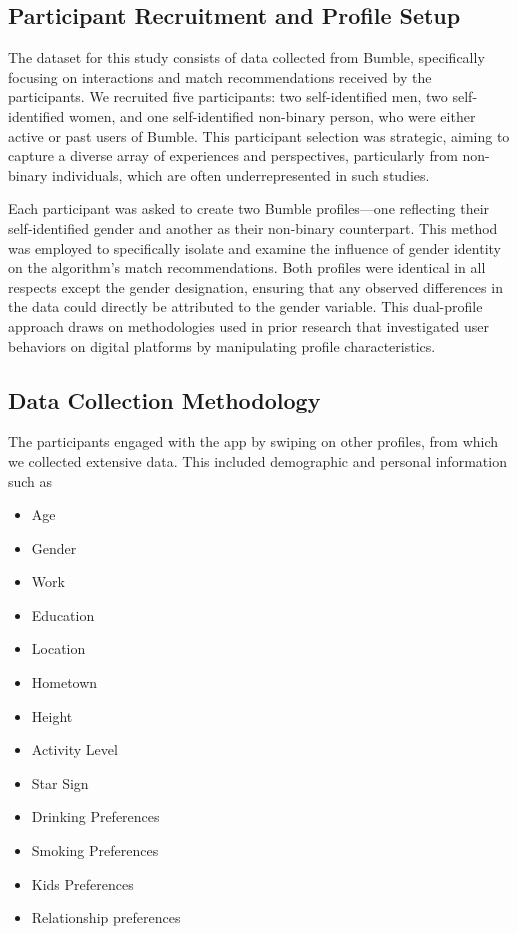 \subsection{Participant Recruitment and Profile Setup}
The dataset for this study consists of data collected from Bumble, specifically focusing on interactions and match recommendations received by the participants. We recruited five participants: two self-identified men, two self-identified women, and one self-identified non-binary person, who were either active or past users of Bumble. This participant selection was strategic, aiming to capture a diverse array of experiences and perspectives, particularly from non-binary individuals, which are often underrepresented in such studies.

Each participant was asked to create two Bumble profiles—one reflecting their self-identified gender and another as their non-binary counterpart. This method was employed to specifically isolate and examine the influence of gender identity on the algorithm’s match recommendations. Both profiles were identical in all respects except the gender designation, ensuring that any observed differences in the data could directly be attributed to the gender variable. This dual-profile approach draws on methodologies used in prior research that investigated user behaviors on digital platforms by manipulating profile characteristics.

\subsection{Data Collection Methodology}
The participants engaged with the app by swiping on other profiles, from which we collected extensive data. This included demographic and personal information such as 
\begin{itemize}
    \item Age
    \item Gender
    \item Work
    \item Education
    \item Location
    \item Hometown
    \item Height 
    \item Activity Level
    \item Star Sign
    \item Drinking Preferences
    \item Smoking Preferences
    \item Kids Preferences 
    \item Relationship preferences
\end{itemize}

